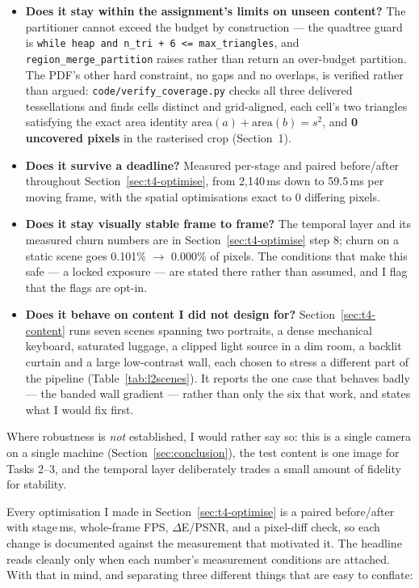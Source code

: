 \documentclass[11pt,a4paper]{article}
\begin{document}
\begin{itemize}
\item \textbf{Does it stay within the assignment's limits on unseen content?}
  The partitioner cannot exceed the budget by construction --- the quadtree
  guard is \texttt{while heap and n\_tri + 6 <= max\_triangles}, and
  \texttt{region\_merge\_partition} raises rather than return an over-budget
  partition. The PDF's other hard constraint, no gaps and no overlaps, is
  verified rather than argued: \texttt{code/verify\_coverage.py} checks all three
  delivered tessellations and finds cells distinct and grid-aligned, each cell's
  two triangles satisfying the exact area identity
  $\mathrm{area}(a) + \mathrm{area}(b) = s^{2}$, and \textbf{0 uncovered
  pixels} in the rasterised crop (Section~1).
\item \textbf{Does it survive a deadline?} Measured per-stage and paired
  before/after throughout Section~\ref{sec:t4-optimise}, from 2{,}140\,ms down to
  59.5\,ms per moving frame, with the spatial optimisations exact to 0 differing
  pixels.
\item \textbf{Does it stay visually stable frame to frame?} The temporal layer
  and its measured churn numbers are in Section~\ref{sec:t4-optimise} step 8;
  churn on a static scene goes 0.101\% $\rightarrow$ 0.000\% of pixels. The
  conditions that make this safe --- a locked exposure --- are stated there rather
  than assumed, and I flag that the flags are opt-in.
\item \textbf{Does it behave on content I did not design for?}
  Section~\ref{sec:t4-content} runs seven scenes spanning two portraits, a dense
  mechanical keyboard, saturated luggage, a clipped light source in a dim room,
  a backlit curtain and a large low-contrast wall, each chosen to stress a
  different part of the pipeline (Table~\ref{tab:l2scenes}). It reports the one
  case that behaves badly --- the banded wall gradient --- rather than only the
  six that work, and states what I would fix first.
\end{itemize}

Where robustness is \emph{not} established, I would rather say so: this is a
single camera on a single machine (Section~\ref{sec:conclusion}), the test
content is one image for Tasks 2--3, and the temporal layer deliberately trades a
small amount of fidelity for stability.

Every optimisation I made in Section~\ref{sec:t4-optimise} is a paired
before/after with stage\,ms, whole-frame FPS, $\Delta$E/PSNR, and a pixel-diff
check, so each change is documented against the measurement that motivated it.
The headline reads cleanly only when each number's measurement conditions are
attached. With that in mind, and separating three different things that are easy
to conflate:
\end{document}
